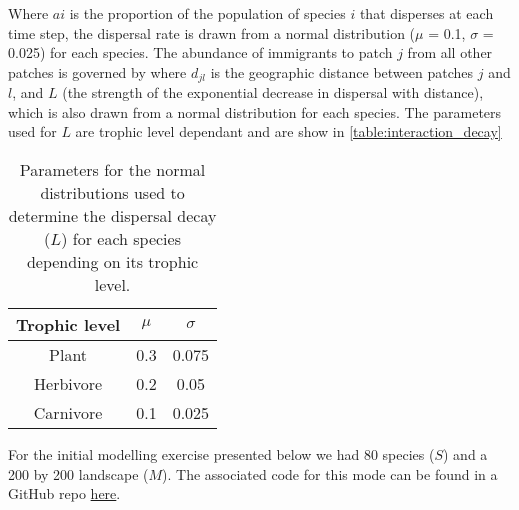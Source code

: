 Where $ai$ is the proportion of the population of species $i$ that disperses at
each time step, the dispersal rate is drawn from a normal distribution ($\mu$ =
0.1, $\sigma$ = 0.025) for each species. The abundance of immigrants to patch
$j$ from all other patches is governed by where $d_{jl}$ is the geographic
distance between patches $j$ and $l$, and $L$ (the strength of the exponential
decrease in dispersal with distance), which is also drawn from a normal
distribution for each species. The parameters used for $L$ are trophic level
dependant and are show in \autoref{table:interaction_decay}

\begin{table}[h!]
\centering
\begin{tabular}{||c c c||} 
 \hline
Trophic level & $\mu$ & $\sigma$ \\ [0.5ex] \hline\hline
 Plant & 0.3 & 0.075 \\ 
 Herbivore & 0.2 & 0.05 \\
 Carnivore & 0.1 & 0.025 \\ [1ex] 
 \hline
\end{tabular}
\caption{Parameters for the normal distributions used to determine the dispersal
decay ($L$) for each species depending on its trophic level.}
\label{table:interaction_decay}
\end{table}

For the initial modelling exercise presented below we had 80 species ($S$) and
a 200 by 200 landscape ($M$). The associated code for this mode can be found in a
GitHub repo \href{https://github.com/PoisotLab/Omnomnomivores}{here}.